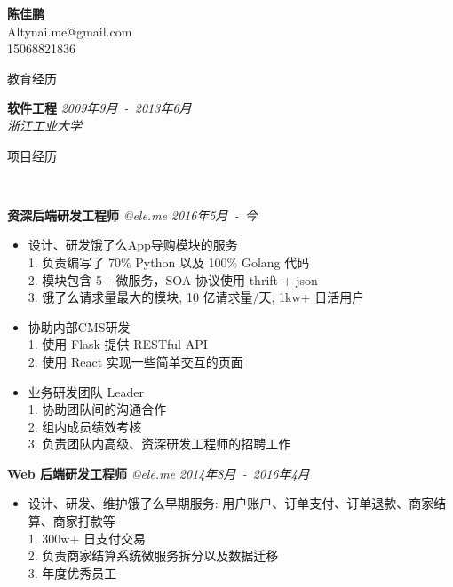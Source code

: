 ﻿\documentclass[9pt]{article}
\newenvironment{changemargin}[2]{%
  \begin{list}{}{%
    \setlength{\topsep}{0pt}%
    \setlength{\leftmargin}{#1}%
    \setlength{\rightmargin}{#2}%
    \setlength{\listparindent}{\parindent}%
    \setlength{\itemindent}{\parindent}%
    \setlength{\parsep}{\parskip}%
  }%
  \item[]}{\end{list}
}
\newcommand{\lineover}{
	\begin{changemargin}{-0.05in}{-0.05in}
		\vspace*{-8pt}
		\hrulefill \\
		\vspace*{-2pt}
	\end{changemargin}
}
\newcommand{\header}[1]{
	\begin{changemargin}{-0.5in}{-0.5in}
		\scshape{#1}\\
  	\lineover
	\end{changemargin}
}
\newcommand{\contact}[4]{
	\begin{changemargin}{-0.5in}{-0.5in}
		\begin{center}
			{\Large \scshape \textbf{#1}}\\ \smallskip
			{#2}\\ \smallskip
			{#3}\\ \smallskip
			{#4}\smallskip
		\end{center}
	\end{changemargin}
}
\newenvironment{body} {
	\vspace*{-16pt}
	\begin{changemargin}{-0.25in}{-0.5in}
  }	
	{\end{changemargin}
}
\begin{document}
\contact{陈佳鹏}{Altynai.me@gmail.com}{15068821836}

\header{教育经历}
\begin{body}
	\vspace{14pt}
	\textbf{软件工程} \hfill \emph{2009年9月~-~2013年6月} \\
	\emph{浙江工业大学}\\
\end{body}

\smallskip

\header{项目经历}

\begin{body}
	\vspace{14pt}

    \textbf{资深后端研发工程师} \emph{@ele.me} \hfill \emph{2016年5月~-~今}\\
    \vspace*{-4pt}
    \begin{itemize} \itemsep -0pt  %
        \item 设计、研发饿了么App导购模块的服务\\
        1. 负责编写了 70\% Python 以及 100\% Golang 代码\\
        2. 模块包含 5+ 微服务，SOA 协议使用 thrift + json\\
        3. 饿了么请求量最大的模块, 10 亿请求量/天, 1kw+ 日活用户\\
        \item 协助内部CMS研发\\
        1. 使用 Flask 提供 RESTful API \\
        2. 使用 React 实现一些简单交互的页面 \\
        \item 业务研发团队 Leader\\
        1. 协助团队间的沟通合作\\
        2. 组内成员绩效考核\\
        3. 负责团队内高级、资深研发工程师的招聘工作\\
    \end{itemize}

    \textbf{Web 后端研发工程师} \emph{@ele.me} \hfill \emph{2014年8月~-~2016年4月}\\
    \vspace*{-4pt}
    \begin{itemize} \itemsep -0pt  %
        \item 设计、研发、维护饿了么早期服务: 用户账户、订单支付、订单退款、商家结算、商家打款等\\
        1. 300w+ 日支付交易\\
        2. 负责商家结算系统微服务拆分以及数据迁移\\
        3. 年度优秀员工\\
    \end{itemize}


\end{body}
\end{document}
